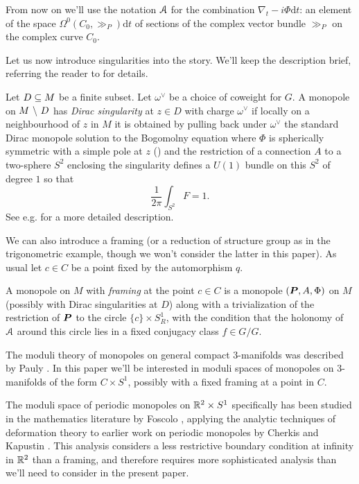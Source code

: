 \documentclass[10pt, oneside]{article}
\renewcommand{\d}{\mathrm{d}}
\begin{document}
\begin{definition} 
From now on we'll use the notation $\mathcal{A}$ for the combination $\nabla_t - i\Phi \d t$: an element of the space $\Omega^0(C_0, \gg_P)\d t$ of sections of the complex vector bundle $\gg_P$ on the complex curve $C_0$. 
\end{definition}

Let us now introduce singularities into the story.  We'll keep the description brief, referring the reader to \cite{CharbonneauHurtubise, Smith} for details.
\begin{definition}
  Let $D \subseteq M$ be a finite subset.  Let $\omega^\vee$ be a choice of coweight for $G$.  A monopole on $M \ \backslash \  D$ has \emph{Dirac singularity} at $z \in D$ with charge $\omega^\vee$ if locally on a neighbourhood of $z$ in $M$ it is obtained by pulling back under $\omega^\vee$ the standard Dirac monopole solution to the Bogomolny equation where $\Phi$ is spherically symmetric with a simple pole at $z$ () and the restriction of a connection $A$ to a two-sphere $S^2$ enclosing the singularity defines a $U(1)$ bundle on this $S^2$ of degree $1$ so that
    \[\frac{1}{2\pi} \int_{S^2} F = 1 .\]
  See e.g. \cite[Section 2.2]{CharbonneauHurtubise} for a more detailed description.
\end{definition}

We can also introduce a framing (or a reduction of structure group as in the trigonometric example, though we won't consider the latter in this paper).  As usual let $c \in C$ be a point fixed by the automorphism $q$.
\begin{definition}
  A monopole on $M$ with \emph{framing} at the point $c \in C$ is a monopole $(\boldsymbol{P},A,\Phi)$ on $M$ (possibly with Dirac singularities at $D$) along with a trivialization of the restriction of $\boldsymbol{P}$ to the circle $\{c\} \times S^1_R$, with the condition that the holonomy of $\mathcal{A}$ around this circle lies in a fixed conjugacy class $f \in G/G$.
\end{definition}

The moduli theory of monopoles on general compact 3-manifolds was described by Pauly \cite{Pauly}.  In this paper we'll be interested in moduli spaces of monopoles on 3-manifolds of the form $C \times S^1$, possibly with a fixed framing at a point in $C$.  

\begin{remark}
The moduli space of periodic monopoles on $\mathbb{R}^2 \times S^1$ specifically has been studied in the mathematics literature by Foscolo \cite{FoscoloDef} , applying the analytic techniques of deformation theory to earlier work on periodic monopoles by Cherkis and Kapustin \cite{CherkisKapustin1, CherkisKapustin2}. This analysis considers a less restrictive boundary condition at infinity in $\mathbb{R}^2$ than a framing, and therefore requires more sophisticated analysis than we'll need to consider in the present paper.
\end{remark}
\end{document}
